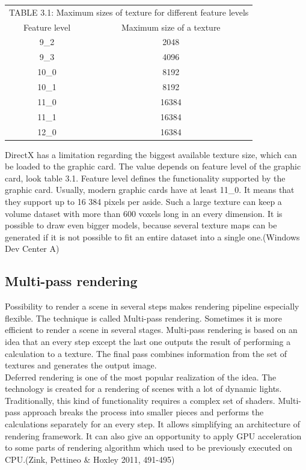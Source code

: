 \documentclass[twoside, english, 11pt]{report}
\begin{document}
\begin{table}[!h]
 \begin{center}
    \begin{tabular}{ c  c }
    \multicolumn{2}{l}{TABLE 3.1: Maximum sizes of texture for different feature levels \label{tab:level}}\\
    Feature level & Maximum size of a texture\\
    \hline
    9\_2 & 2048\\
    9\_3 & 4096\\
    10\_0 & 8192\\
    10\_1 & 8192\\
    11\_0 & 16384\\
    11\_1 & 16384\\
    12\_0 & 16384\\
    \end{tabular}

  \end{center}
\end{table}
DirectX has a limitation regarding the biggest available texture size, which can be loaded to the graphic card. The value depends on feature level of the graphic card, look table 3.1. Feature level defines the functionality supported by the graphic card. Usually, modern graphic cards have at least 11\_0. It means that they support up to 16 384 pixels per aside. Such a large texture can keep a volume dataset with more than 600 voxels long in an every dimension. It is possible to draw even bigger models, because several texture maps can be generated if it is not possible to fit an entire dataset into a single one.(Windows Dev Center A)\\

\subsection{Multi-pass rendering}

Possibility to render a scene in several steps makes rendering pipeline especially flexible. The technique is called Multi-pass rendering. Sometimes it is more efficient to render a scene in several stages. Multi-pass rendering is based on an idea that an every step except the last one outputs the result of performing a calculation to a texture. The final pass combines information from the set of textures and generates the output image.\\

Deferred rendering is one of the most popular realization of the idea. The technology is created for a rendering of scenes with a lot of dynamic lights. Traditionally, this kind of functionality requires a complex set of shaders. Multi-pass approach breaks the process into smaller pieces and performs the calculations separately for an every step. It allows simplifying an architecture of rendering framework. It can also give an opportunity to apply GPU acceleration to some parts of rendering algorithm which used to be previously executed on CPU.(Zink, Pettineo \& Hoxley 2011, 491-495)\\
\end{document}
